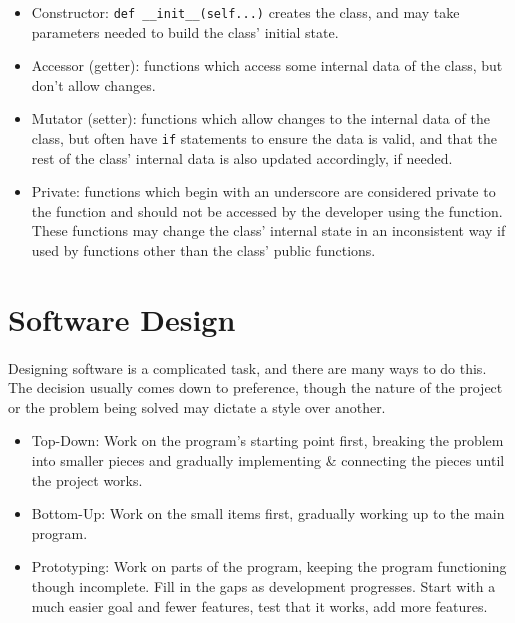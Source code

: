 \documentclass[letter,10pt]{article}
\begin{document}
\begin{itemize}
    \item Constructor: \verb|def __init__(self...)| creates the class, and may take parameters needed to build the class' initial state.
    \item Accessor (getter): functions which access some internal data of the class, but don't allow changes.
    \item Mutator (setter): functions which allow changes to the internal data of the class, but often have \verb|if| statements to ensure the data is valid, and that the rest of the class' internal data is also updated accordingly, if needed.
    \item Private: functions which begin with an underscore are considered private to the function and should not be accessed by the developer using the function. These functions may change the class' internal state in an inconsistent way if used by functions other than the class' public functions.
\end{itemize}

\section{Software Design}
\paragraph{}Designing software is a complicated task, and there are many ways to do this. The decision usually comes down to preference, though the nature of the project or the problem being solved may dictate a style over another.

\begin{itemize}
    \item Top-Down: Work on the program's starting point first, breaking the problem into smaller pieces and gradually implementing \& connecting the pieces until the project works.
    \item Bottom-Up: Work on the small items first, gradually working up to the main program.
    \item Prototyping: Work on parts of the program, keeping the program functioning though incomplete. Fill in the gaps as development progresses. Start with a much easier goal and fewer features, test that it works, add more features.
\end{itemize}
\end{document}
